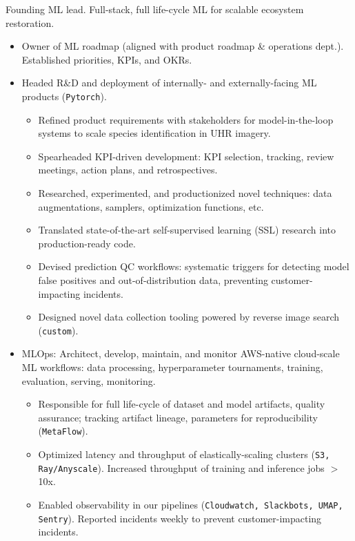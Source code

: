 \documentclass[a4paper,12pt]{article}
\begin{document}
    \vspace{-6pt} Founding ML lead. Full-stack, full life-cycle ML for scalable ecosystem restoration.
    \begin{itemize}
        \item Owner of ML roadmap (aligned with product roadmap \& operations dept.). Established priorities, KPIs, and OKRs.
        \item Headed R\&D and deployment of internally- and externally-facing ML products (\texttt{Pytorch}).
        \begin{itemize}
            \item Refined product requirements with stakeholders for model-in-the-loop systems to scale species identification in UHR imagery.
            \item Spearheaded KPI-driven development: KPI selection, tracking, review meetings, action plans, and retrospectives.
            \item Researched, experimented, and productionized novel techniques: data augmentations, samplers, optimization functions, etc.
            \item Translated state-of-the-art self-supervised learning (SSL) research into production-ready code.
            \item Devised prediction QC workflows: systematic triggers for detecting model false positives and out-of-distribution data, preventing customer-impacting incidents.
            \item Designed novel data collection tooling powered by reverse image search (\texttt{custom}).
        \end{itemize}
        \item MLOps: Architect, develop, maintain, and monitor AWS-native cloud-scale ML workflows: data processing, hyperparameter tournaments, training, evaluation, serving, monitoring.
        \begin{itemize}
            \item Responsible for full life-cycle of dataset and model artifacts, quality assurance;
            tracking artifact lineage, parameters for reproducibility (\texttt{MetaFlow}).
            \item Optimized latency and throughput of elastically-scaling clusters (\texttt{S3, Ray/Anyscale}). Increased throughput of training and inference jobs $>$10x.
            \item Enabled observability in our pipelines (\texttt{Cloudwatch, Slackbots, UMAP, Sentry}). Reported incidents weekly to prevent customer-impacting incidents.

\end{itemize}
\end{itemize}
\end{document}
